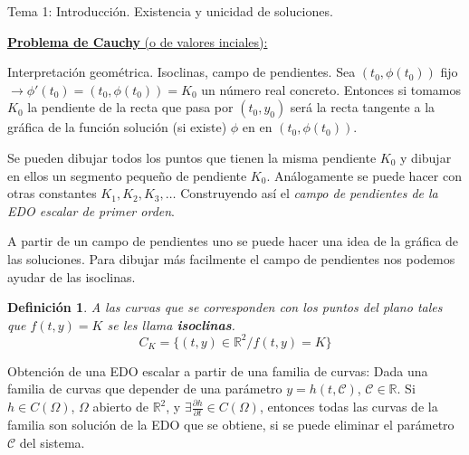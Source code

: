 \documentclass{article}
\newcommand{\R}[1]{$\mathbb{R}^#1$}
\newcommand{\parcial}[2]{\frac{\partial  #1}{\partial #2}}
\newtheorem{definition}{Definición}[section]
\begin{document}
\begin{section}{Tema 1: Introducción. Existencia y unicidad de soluciones.}
\begin{subsection}{\underline{\textbf{Problema de Cauchy} (o de valores inciales):}}
\begin{subsection}{Interpretación geométrica. Isoclinas, campo de pendientes.}
            Sea $(t_0, \phi(t_0))$ fijo $\longrightarrow \phi'(t_0) = (t_0, \phi(t_0)) = K_0$ un número real concreto. Entonces si tomamos $K_0$ la pendiente de la recta que pasa por 
            $(t_0, y_0)$ será la recta tangente a la gráfica de la función solución (si existe) $\phi$ en en $(t_0, \phi(t_0))$.

            Se pueden dibujar todos los puntos que tienen la misma pendiente $K_0$ y dibujar en ellos un segmento pequeño de pendiente $K_0$. Análogamente se puede hacer con otras constantes $K_1, K_2, K_3, \dots$ Construyendo así el \textit{campo de pendientes de la EDO escalar de primer orden}.

            A partir de un campo de pendientes uno se puede hacer una idea de la gráfica de las soluciones. Para dibujar más facilmente el campo de pendientes nos podemos ayudar de las isoclinas.

            \begin{definition}
                A las curvas que se corresponden con los puntos del plano tales que $f(t,y) = K$ se les llama \textbf{isoclinas}.
                \[C_K = \{(t,y)\in \mathbb{R}^2 / f(t,y) = K\}\]
            \end{definition}
            
        \end{subsection}

        \begin{subsection}{Obtención de una EDO escalar a partir de una familia de curvas:}
            Dada una familia de curvas que depender de una parámetro $y=h(t,\mathcal{C})$, $\mathcal{C}\in\mathbb{R}$. Si $h\in C(\Omega)$, $\Omega$ abierto de \R{2}, y $\exists \parcial{h}{t}\in C(\Omega)$, entonces
            todas las curvas de la familia son solución de la EDO que se obtiene, si se puede eliminar el parámetro $\mathcal{C}$ del sistema.
        \end{subsection}
    \end{subsection}

\end{section}
\end{document}

